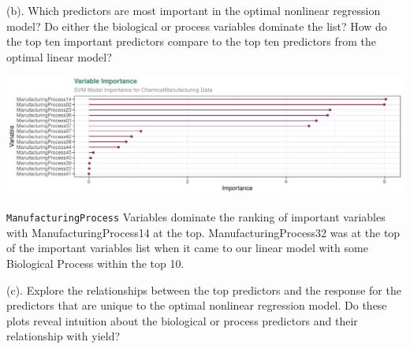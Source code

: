 \documentclass[]{report}
\begin{document}
\begin{subquestion}{(b).}
Which predictors are most important in the optimal nonlinear regression model? Do either the biological or process variables dominate the list? How do the top ten important predictors compare to the top ten predictors from the optimal linear model? 
\end{subquestion}

\includegraphics{Homework-Two_files/figure-latex/kj-7.5b-1.pdf}

\texttt{ManufacturingProcess} Variables dominate the ranking of
important variables with ManufacturingProcess14 at the top.
ManufacturingProcess32 was at the top of the important variables list
when it came to our linear model with some Biological Process within the
top 10.

\begin{subquestion}{(c).}
Explore the relationships between the top predictors and the response for the predictors that are unique to the optimal nonlinear regression model. Do these plots reveal intuition about the biological or process predictors and their relationship with yield?
\end{subquestion}

\begin{table}

\caption{\label{tab:unnamed-chunk-1}Correlation}
\centering
{}
\end{table}
\end{document}
